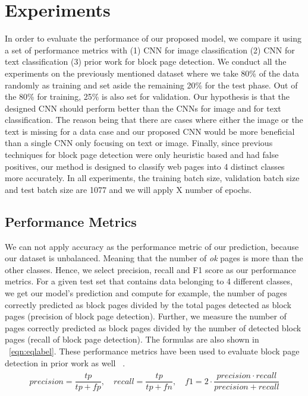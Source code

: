\documentclass{article} %
\begin{document}
\section{Experiments}
\label{experiments}
In order to evaluate the performance of our proposed model, we compare it using a set of performance metrics with (1) CNN for image classification (2) CNN for text classification (3) prior work for block page detection. We conduct all the experiments on the previously mentioned dataset where we take 80\% of the data randomly as training and set aside the remaining 20\% for the test phase. Out of the 80\% for training, 25\% is also set for validation. Our hypothesis is that the designed CNN should perform better than the CNNs for image and for text classification. The reason being that there are cases where either the image or the text is missing for a data case and our proposed CNN would be more beneficial than a single CNN only focusing on text or image. Finally, since previous techniques for block page detection were only heuristic based and had false positives, our method is designed to classify web pages into 4 distinct classes more accurately. In all experiments, the training batch size, validation batch size and test batch size are 1077 and we will apply X number of epochs.

\subsection{Performance Metrics}
We can not apply accuracy as the performance metric of our prediction, because our dataset is unbalanced. Meaning that the number of \textit{ok} pages is more than the other classes. Hence, we select precision, recall and F1 score as our performance metrics. For a given test set that contains data belonging to 4 different classes, we get our model's prediction and compute for example, the number of pages correctly predicted as block pages divided by the total pages detected as block pages (precision of block page detection). Further, we measure the number of pages correctly predicted as block pages divided by the number of detected block pages (recall of block page detection). The formulas are also shown in ~\ref{eqn:eqlabel}. These performance metrics have been used to evaluate block page detection in prior work as well ~\cite{imc14_phillipa}.
\begin{align}
\label{eqn:eqlabel}
\begin{split}
 precision = \dfrac{tp}{tp+fp} , \quad 
recall = \dfrac{tp}{tp+fn}, \quad 
f1 = 2 \cdot \dfrac{precision \cdot recall}{precision + recall}
\end{split}
\end{align}
\end{document}
